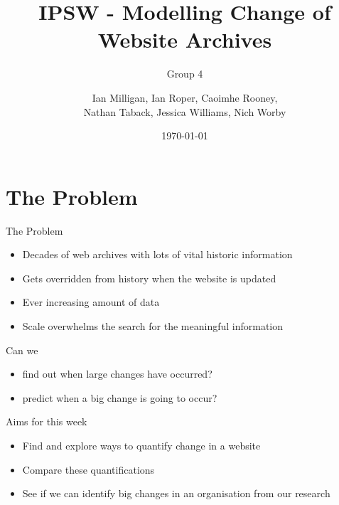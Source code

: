 \documentclass[10pt]{beamer}
\title{IPSW - Modelling Change of Website Archives}
\subtitle{Group 4}
\date{\today}
\author{Ian Milligan, Ian Roper, Caoimhe Rooney, \\Nathan Taback, Jessica Williams, Nich Worby}
\begin{document}
\maketitle


\section{The Problem}

\begin{frame}{The Problem}

\large

\begin{itemize}
\item Decades of web archives with lots of vital historic information 
\item Gets overridden from history when the website is updated
\item Ever increasing amount of data
\item Scale overwhelms the search for the meaningful information
\end{itemize}

\pause

\vspace{5mm}

Can we
\begin{itemize}
\item find out when large changes have occurred?
\item predict when a big change is going to occur?
\end{itemize}

\end{frame}

\begin{frame}{Aims for this week}

\Large

\begin{itemize}
\itemsep1.0em
\item Find and explore ways to quantify change in a website
\item Compare these quantifications
\item See if we can identify big changes in an organisation from our research
\end{itemize}

\end{frame}
\end{document}
